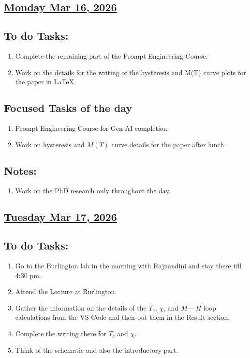 \subsection*{\underline{Monday Mar 16, 2026}}
\subsection*{To do Tasks:}
\begin{enumerate}
    \item Complete the remaining part of the Prompt Engineering Course.
    \item Work on the details for the writing of the hysteresis and M(T) curve plots for the paper in {\LaTeX}.
\end{enumerate}
\subsection*{Focused Tasks of the day}
\begin{enumerate}[\ding{212}]  
    \item Prompt Engineering Course for Gen-AI completion. \cmark
    \item Work on hysteresis and $M(T)$ curve details for the paper after lunch.
\end{enumerate}
\subsection*{Notes:}
\begin{enumerate}
    \item Work on the PhD research only throughout the day.
\end{enumerate}
\subsection*{\underline{Tuesday Mar 17, 2026}}
\subsection*{To do Tasks:}
\begin{enumerate}
    \item Go to the Burlington lab in the morning with Rajnandini and stay there till 4:30 pm. \cmark
    \item Attend the Lecture at Burlington. \cmark
    \item Gather the information on the details of the $T_c$, $\chi$, and $M-H$ loop calculations from the VS Code and then put them in the Result section. \xmark
    \item Complete the writing there for $T_c$ and $\chi$. \cmark
    \item Think of the schematic and also the introductory part. \xmark
\end{enumerate}
